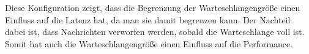 Diese Konfiguration zeigt, dass die Begrenzung der Warteschlangengröße einen Einfluss auf die Latenz hat, da man sie damit begrenzen kann. Der Nachteil dabei ist, dass Nachrichten verworfen werden, sobald die Warteschlange voll ist. Somit hat auch die Warteschlangengröße einen Einfluss auf die Performance. 






